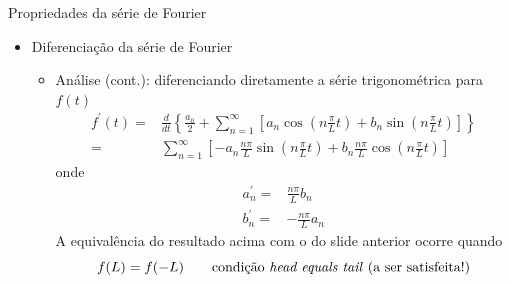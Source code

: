       \begin{slide}[toc = ]{Propriedades da série de Fourier}
	      \begin{itemize}
		      \item Diferenciação da série de Fourier
			      \begin{itemize}
				      \item Análise (cont.): diferenciando diretamente a série trigonométrica para $f(t)$
					      \begin{align*}
						      f^\prime (t) =&\frac{d}{dt}\left \{\frac{a_0}{2} + \sum_{n=1}^\infty \left [ a_n  \cos \left ( n\frac{\pi}{L}t \right ) + b_n \sin \left ( n\frac{\pi}{L}t \right )\right ]\right \}\\
						      =& \sum_{n=1}^\infty \left [- a_n\frac{n\pi}{L}  \sin \left ( n\frac{\pi}{L}t \right ) + b_n \frac{n\pi}{L}\cos \left ( n\frac{\pi}{L}t \right )\right ]
					      \end{align*}
					      onde 
					      \begin{align*}
						      a_n^\prime =& \frac{n\pi}{L}b_n\\
					              b_n^\prime =& - \frac{n\pi}{L}a_n
					      \end{align*}
					      A equivalência do resultado acima com o do slide anterior ocorre quando
					      \begin{equation*}
						      f(L) = f(-L)\qquad \text{condição \emph{head equals tail} (a ser satisfeita!)}
					      \end{equation*}
			      \end{itemize}
	      \end{itemize}
      \end{slide}

